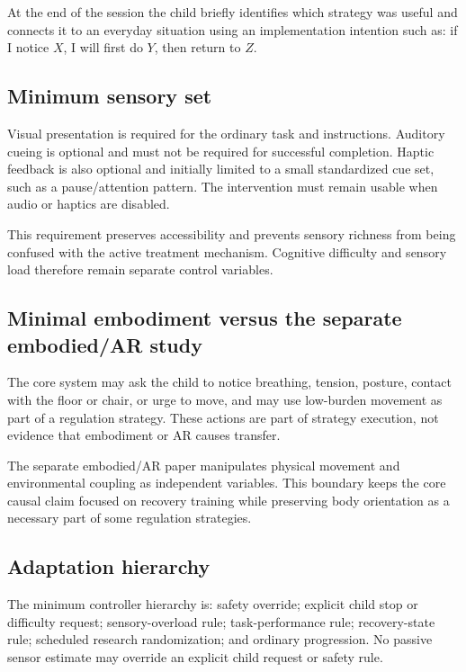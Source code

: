 At the end of the session the child briefly identifies which strategy was useful and connects it to an everyday situation using an implementation intention such as: if I notice \(X\), I will first do \(Y\), then return to \(Z\).

\subsection{Minimum sensory set}

Visual presentation is required for the ordinary task and instructions. Auditory cueing is optional and must not be required for successful completion. Haptic feedback is also optional and initially limited to a small standardized cue set, such as a pause/attention pattern. The intervention must remain usable when audio or haptics are disabled.

This requirement preserves accessibility and prevents sensory richness from being confused with the active treatment mechanism. Cognitive difficulty and sensory load therefore remain separate control variables.

\subsection{Minimal embodiment versus the separate embodied/AR study}

The core system may ask the child to notice breathing, tension, posture, contact with the floor or chair, or urge to move, and may use low-burden movement as part of a regulation strategy. These actions are part of strategy execution, not evidence that embodiment or AR causes transfer.

The separate embodied/AR paper manipulates physical movement and environmental coupling as independent variables. This boundary keeps the core causal claim focused on recovery training while preserving body orientation as a necessary part of some regulation strategies.

\subsection{Adaptation hierarchy}

The minimum controller hierarchy is: safety override; explicit child stop or difficulty request; sensory-overload rule; task-performance rule; recovery-state rule; scheduled research randomization; and ordinary progression. No passive sensor estimate may override an explicit child request or safety rule.

